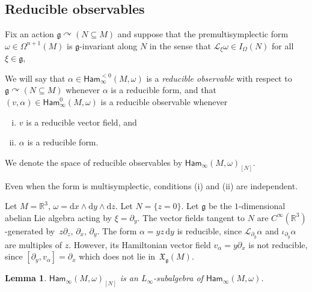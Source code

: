 \documentclass[pdftex]{sigma}
\numberwithin{equation}{section}
\newtheorem{Lemma}[Theorem]{Lemma}
\newcommand{\g}{\mathfrak{g}}
\newcommand{\Ham}{\mathsf{Ham}}
\newcommand{\fgmodule}{\mathfrak{X}_{\g}}
\renewcommand{\L}{\mathscr{L}}
\renewcommand{\subset}{\subseteq}
\renewcommand{\d}{\mathrm{d}}
\begin{document}
\subsection{Reducible observables}%

Fix an action $\g\curvearrowright(N\subset M)$ and suppose that the premultisymplectic form $\omega\in\Omega^{n+1}(M)$ is $\g$-invariant along $N$ in the sense that $\L_\xi\omega\in I_\Omega(N)$ for all $\xi\in\g$,

\begin{Definition}\label{def:reducibleObservables}
	We will say that $\alpha\in \Ham_\infty^{<0}(M,\omega)$ is a \emph{reducible observable} with respect to $\g\curvearrowright(N\subset M)$ whenever $\alpha$ is a reducible form, and that $(v,\alpha)\in\Ham_\infty^0(M,\omega)$ is a reducible observable whenever
	\begin{enumerate}[i.]\itemsep=0pt
		\item[(i)] $v$ is a reducible vector field, and
		\item[(ii)] $\alpha$ is a reducible form.
	\end{enumerate}
	We denote the space of reducible observables by $\Ham_\infty(M,\omega)_{[N]}$.
\end{Definition}

Even when the form is multisymplectic, conditions (i) and (ii) are independent.

\begin{Example}
	Let $M=\mathbb R^3$, $\omega=\d x\wedge \d y\wedge \d z$. Let $N=\{z=0\}$. Let $\mathfrak g$ be the $1$-dimensional abelian Lie algebra acting by $\xi=\partial_y$. The vector fields tangent to $N$ are $C^\infty(\mathbb R^3)$-generated by~$z\partial_z$, $\partial_x$, $\partial_y$.
	The form $\alpha=yz\,\d y$ is reducible, since $\L_{\partial_y}\alpha$ and $\iota_{\partial_y}\alpha$ are multiples of $z$. However, its Hamiltonian vector field $v_\alpha=y\partial_x$ is not reducible, since $[\partial_y,v_\alpha]=\partial_x$ which does not lie in~$\fgmodule(M)$.
\end{Example}

\begin{Lemma}%
	$\Ham_\infty(M,\omega)_{[N]}$ is an $L_\infty$-subalgebra of $\Ham_\infty(M,\omega)$.
\end{Lemma}
\end{document}
